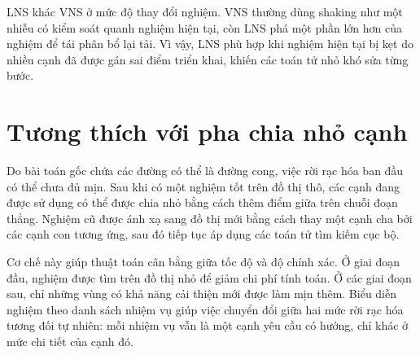 LNS khác VNS ở mức độ thay đổi nghiệm. VNS thường dùng shaking như một nhiễu có kiểm soát quanh nghiệm hiện tại, còn LNS phá một phần lớn hơn của nghiệm để tái phân bổ lại tải. Vì vậy, LNS phù hợp khi nghiệm hiện tại bị kẹt do nhiều cạnh đã được gán sai điểm triển khai, khiến các toán tử nhỏ khó sửa từng bước.

\section{Tương thích với pha chia nhỏ cạnh}

Do bài toán gốc chứa các đường có thể là đường cong, việc rời rạc hóa ban đầu có thể chưa đủ mịn. Sau khi có một nghiệm tốt trên đồ thị thô, các cạnh đang được sử dụng có thể được chia nhỏ bằng cách thêm điểm giữa trên chuỗi đoạn thẳng. Nghiệm cũ được ánh xạ sang đồ thị mới bằng cách thay một cạnh cha bởi các cạnh con tương ứng, sau đó tiếp tục áp dụng các toán tử tìm kiếm cục bộ.

Cơ chế này giúp thuật toán cân bằng giữa tốc độ và độ chính xác. Ở giai đoạn đầu, nghiệm được tìm trên đồ thị nhỏ để giảm chi phí tính toán. Ở các giai đoạn sau, chỉ những vùng có khả năng cải thiện mới được làm mịn thêm. Biểu diễn nghiệm theo danh sách nhiệm vụ giúp việc chuyển đổi giữa hai mức rời rạc hóa tương đối tự nhiên: mỗi nhiệm vụ vẫn là một cạnh yêu cầu có hướng, chỉ khác ở mức chi tiết của cạnh đó.
